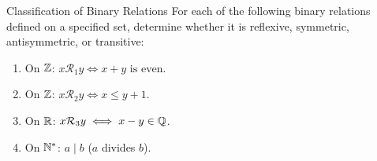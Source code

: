 \begin{exercise}{Classification of Binary Relations}
For each of the following binary relations defined on a specified set, determine whether it is reflexive, symmetric, antisymmetric, or transitive:
\begin{enumerate}[leftmargin=1.5em,itemsep=2pt]
  \item On $\mathbb{Z}$: $x \mathcal{R}_1 y \iff x + y \text{ is even}$.
  \item On $\mathbb{Z}$: $x \mathcal{R}_2 y \iff x \le y + 1$.
  \item On $\mathbb{R}$: $x \mathcal{R}_3 y \iff x - y \in \mathbb{Q}$.
  \item On $\mathbb{N}^*$: $a \mid b$ ($a$ divides $b$).
\end{enumerate}
\end{exercise}

\begin{tabletworkspace}[5.0cm]
\end{tabletworkspace}

